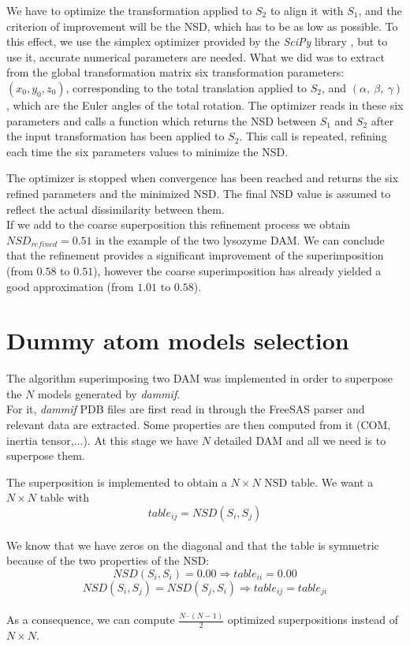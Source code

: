 \documentclass[a4paper, 11pt]{report}
\begin{document}
We have to optimize the transformation applied to $S_{2}$ to align it 
with $S_{1}$, and the criterion of improvement will be the NSD, which 
has to be as low as possible. 
To this effect, we use the simplex optimizer provided by the 
\textit{SciPy} library \cite{scipy}, but to use it, accurate numerical 
parameters are needed. 
What we did was to extract from the global transformation matrix 
six transformation parameters: 
$(x_{0}, y_{0}, z_{0})$, 
corresponding to the total translation applied to $S_{2}$, and 
$(\alpha,\ \beta,\ \gamma)$, 
which are the Euler angles of the total rotation. 
The optimizer reads in these six parameters and calls a function which 
returns the NSD between $S_{1}$ and $S_{2}$ after the input 
transformation has been applied to $S_{2}$. 
This call is repeated, refining each time the six parameters values to 
minimize the NSD.

The optimizer is stopped when convergence has been reached and returns 
the six refined parameters and the minimized NSD. 
The final NSD value is assumed to reflect the actual dissimilarity 
between them.\\

If we add to the coarse superposition this refinement process we 
obtain $NSD_{refined} = 0.51$ in the example of the two lysozyme DAM. 
We can conclude that the refinement provides a significant improvement 
of the superimposition (from $0.58$ to $0.51$), however the coarse 
superimposition has already yielded a good approximation (from $1.01$ 
to $0.58$).

\section{Dummy atom models selection}

The algorithm superimposing two DAM was implemented in order to 
superpose the $N$ models generated by \textit{dammif}.\\

For it, \textit{dammif} PDB files are first read in through the 
FreeSAS parser and relevant data are extracted. 
Some properties are then computed from it (COM, inertia tensor,...). 
At this stage we have $N$ detailed DAM and all we need is to 
superpose them.

The superposition is implemented to obtain a $N \times N$ NSD table. 
We want a $N \times N$ table with 
\[
table_{ij}=NSD(S_{i},S_{j})
\]\\ 
We know that we have zeros on the diagonal and that the table is 
symmetric because of the two properties of the NSD:
\[
NSD(S_{i},S_{i})=0.00 \Rightarrow table_{ii}=0.00
\]
\[
NSD(S_{i},S_{j}) = NSD(S_{j},S_{i}) \Rightarrow table_{ij}=table_{ji}
\]\\
As a consequence, we can compute $\frac{N \cdot (N-1)}{2}$ optimized 
superpositions instead of $N \times N$.\\
\end{document}
